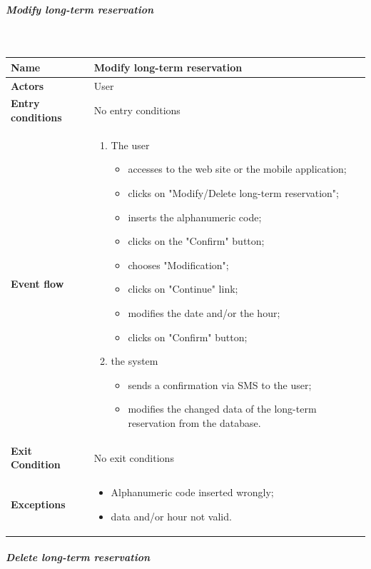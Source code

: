 		\newpage
		\subparagraph{Modify long-term reservation}
		~\\[0.2cm]
		\vspace{20pt}
		\noindent
		\begin{tabular}{l l}
		 \textbf {Name} & Modify long-term reservation  \\ \hline
		 \textbf{Actors} & User \\ \hline
		 \textbf{Entry conditions} & No entry conditions \\ \hline
		 \textbf{Event flow} & 
		 \parbox{0.7\textwidth}{
		 \begin{enumerate}
		 \item The user
		 \begin{itemize}
		 \item accesses to the web site or the mobile application;
		 \item clicks on "Modify/Delete long-term reservation";
		 \item inserts the alphanumeric code;
		 \item clicks on the "Confirm" button;
		 \item chooses "Modification";
		 \item clicks on "Continue" link;
		 \item modifies the date and/or the hour;
		 \item clicks on "Confirm" button;
		 \end{itemize}
		 \item the system
		 \begin{itemize}
		 \item sends a confirmation via SMS to the user;
		 \item modifies the changed data of the long-term reservation from the database.
		 \end{itemize}
		 \end{enumerate}
		 } \\ \hline
		 \textbf{Exit Condition} & No exit conditions \\ \hline
		 \textbf{Exceptions} &  \parbox{0.7\textwidth}{ 
		 \begin{itemize}
		 \item Alphanumeric code inserted wrongly;
		 \item data and/or hour not valid.
		 \end{itemize}
		 }
		\end{tabular}
		\newpage
		\subparagraph{Delete long-term reservation}
		~\\[0.2cm]
		\vspace{20pt}

